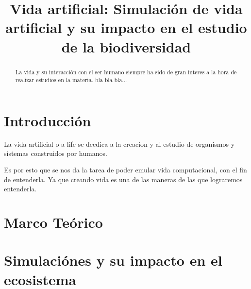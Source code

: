 \documentclass[conference]{IEEEtran}
\begin{document}
 

\title{Vida artificial: Simulaci\'on de vida artificial y su impacto en el estudio de la biodiversidad }



\author{

}


\maketitle


\begin{abstract}
La vida y su interacci\`on con el ser humano siempre ha sido de gran interes a la hora de realizar estudios en la materia. 
bla bla bla... 



\end{abstract}

\section{Introducci\'on}

La vida artificial o a-life se decdica a la creacion y al estudio de organismos y sistemas construidos por humanos. \cite{artificiallifelevy} 

Es por esto que se nos da la tarea de poder emular vida computacional, con el fin de entenderla. Ya que creando vida es una de las maneras de las que lograremos entenderla. \cite{artificiallifelevy}  

\section{Marco Te\'orico}


\section{Simulaci\'ones y su impacto en el ecosistema}

\end{document}
